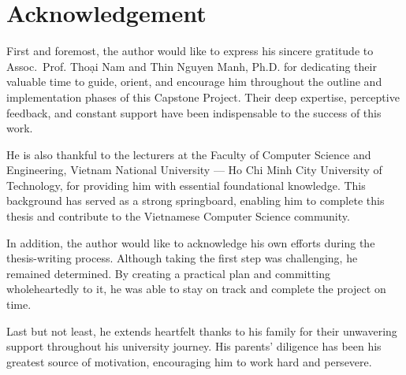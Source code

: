 \chapter*{Acknowledgement}

First and foremost, the author would like to express his sincere gratitude to Assoc.~Prof. Thoại Nam and Thin Nguyen Manh, Ph.D. for dedicating their valuable time to guide, orient, and encourage him throughout the outline and implementation phases of this Capstone Project. Their deep expertise, perceptive feedback, and constant support have been indispensable to the success of this work.

\noindent He is also thankful to the lecturers at the Faculty of Computer Science and Engineering, Vietnam National University --- Ho Chi Minh City University of Technology, for providing him with essential foundational knowledge. This background has served as a strong springboard, enabling him to complete this thesis and contribute to the Vietnamese Computer Science community.

\noindent In addition, the author would like to acknowledge his own efforts during the thesis-writing process. Although taking the first step was challenging, he remained determined. By creating a practical plan and committing wholeheartedly to it, he was able to stay on track and complete the project on time.

\noindent Last but not least, he extends heartfelt thanks to his family for their unwavering support throughout his university journey. His parents' diligence has been his greatest source of motivation, encouraging him to work hard and persevere.

